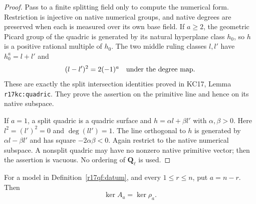 \begin{proof}
Pass to a finite splitting field only to compute the numerical
form.  Restriction is injective on native numerical groups,
and native degrees are preserved when each is measured over
its own base field.  If $a\ge2$, the geometric Picard group of
the quadric is generated by its natural hyperplane class $h_0$,
so $h$ is a positive rational multiple of $h_0$.  The two
middle ruling classes $l,l'$ have
$h_0^a=l+l'$ and
\[
       (l-l')^2=2(-1)^a
       \quad\hbox{under the degree map}.
\]
These are exactly the split intersection identities proved in
KC17, Lemma \texttt{r17kc:quadric}.  They prove the assertion
on the primitive line and hence on its native subspace.

If $a=1$, a split quadric is a quadric surface and
$h=\alpha l+\beta l'$ with $\alpha,\beta>0$.
Here $l^2=(l')^2=0$ and $\deg(ll')=1$.
The line orthogonal to $h$ is generated by
$\alpha l-\beta l'$ and has square $-2\alpha\beta<0$.
Again restrict to the native numerical subspace.  A nonsplit
quadric may have no nonzero native primitive vector; then
the assertion is vacuous.  No ordering of $\mathbf Q_\ell$
is used.
\end{proof}

\begin{theorem}
\label{r17qf:kernel}
For a model in Definition~\ref{r17qf:datum}, and every
$1\le r\le n$, put $a=n-r$.  Then
\[
                         \ker A_a=\ker\rho_a.
 \tag{QF17.3}\label{r17qf:kernel-equality}
\]
\end{theorem}

